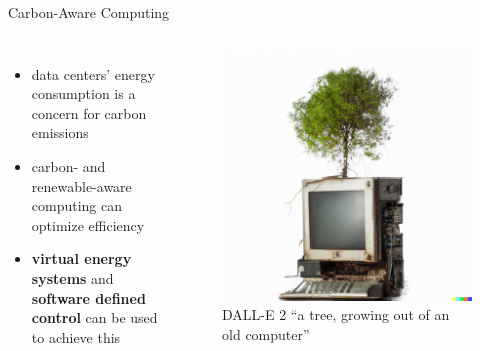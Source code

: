 \begin{frame}{Carbon-Aware Computing}
    \begin{columns}
        \begin{itemize}
            \item data centers' energy consumption is a concern for carbon emissions
            \item carbon- and renewable-aware computing can optimize efficiency
            \item \textbf{virtual energy systems} and \textbf{software defined
                control} can be used to achieve this
        \end{itemize}
        \begin{figure}
            \centering
            \includegraphics[height=.7\textwidth]{../../tree_pc}
            \caption{DALL-E 2 \enquote{a tree, growing out of an old computer}}
            \label{fig:tree_pc}
        \end{figure}
    \end{columns}
\end{frame}
